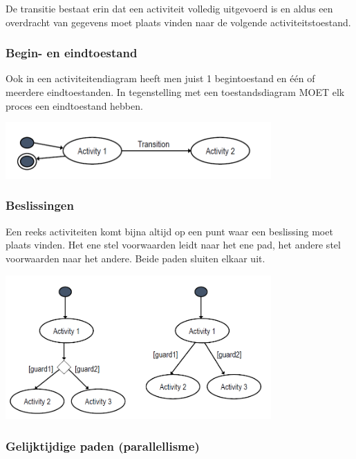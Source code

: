 De transitie bestaat erin dat een activiteit volledig uitgevoerd is en aldus een overdracht van gegevens moet plaats vinden naar de volgende activiteitstoestand.

\subsubsection{Begin- en eindtoestand}

Ook in een activiteitendiagram heeft men juist 1 begintoestand en één of meerdere eindtoestanden. In tegenstelling met een toestandsdiagram MOET elk proces een eindtoestand hebben.


\begin{center}
\includegraphics[width=4in]{img/activity2}%
\end{center}

\subsubsection{Beslissingen}

Een reeks activiteiten komt bijna altijd op een punt waar een beslissing moet plaats vinden. Het ene stel voorwaarden leidt naar het ene pad, het andere stel voorwaarden naar het andere. Beide paden sluiten elkaar uit.


\begin{center}
\includegraphics[width=4in]{img/decision3}%
\end{center}

\subsubsection{Gelijktijdige paden (parallellisme)}

